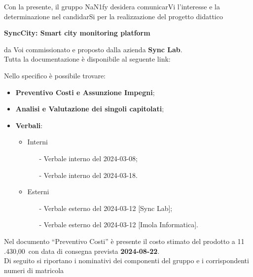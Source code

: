 Con la presente, il gruppo NaN1fy desidera comunicarVi l'interesse e la determinazione nel candidarSi per la realizzazione del progetto didattico \\
\begin{center}
	\textbf{SyncCity: Smart city monitoring platform}
\end{center}
da Voi commissionato e proposto dalla azienda \textbf{Sync Lab}.
\vspace{1em}
\\Tutta la documentazione è disponibile al seguente link: 
\begin{center}
	\textbf{\href{https://github.com/NaN1fy/docs/tree/main/documents/candidatura}{\color{myblue}{https://github.com/NaN1fy/docs/tree/main/documents/candidatura}}}
\end{center}
Nello specifico è possibile trovare:
\begin{itemize}
	\item \textbf{Preventivo Costi e Assunzione Impegni};
	\item \textbf{Analisi e Valutazione dei singoli capitolati};
	\item \textbf{Verbali}: 
		\begin{itemize}
			\item Interni 
				\begin{itemize}
					\item[-] Verbale interno del 2024-03-08;
					\item[-] Verbale interno del 2024-03-18.
				\end{itemize}
			\item Esterni
				\begin{itemize}
					\item[-] Verbale esterno del 2024-03-12 [Sync Lab];
					\item[-] Verbale esterno del 2024-03-12 [Imola Informatica].
				\end{itemize}
		\end{itemize}
\end{itemize}
\vspace{1em}
Nel documento “Preventivo Costi” è presente il costo stimato del prodotto a 11 .430,00\;\texteuro\ con data di consegna prevista \textbf{2024-08-22}.\\
\vspace{1em}
Di seguito si riportano i nominativi dei componenti del gruppo e i corrispondenti numeri di matricola\\

